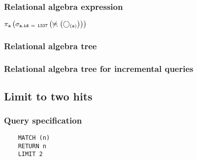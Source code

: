 	\subsubsection*{Relational algebra expression}

	$\projection{\var{a}} \left(\selection{\mathtt{a.id~=~1337}} \left(\alldifferent{} \left(\getvertices{a}{}\right)\right)\right)$

	\subsubsection*{Relational algebra tree}


	\subsubsection*{Relational algebra tree for incremental queries}

	\subsection{Limit to two hits}

	\subsubsection*{Query specification}

	\begin{lstlisting}
	MATCH (n)
	RETURN n
	LIMIT 2
	\end{lstlisting}



